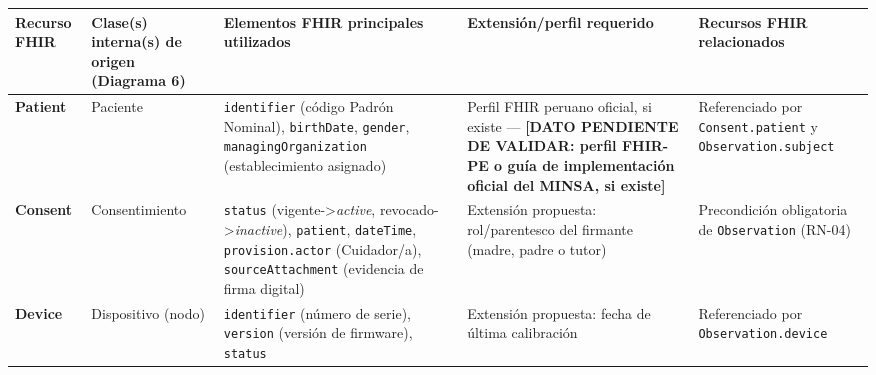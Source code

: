 \documentclass[11pt,a4paper]{article}
\begin{document}
{\small
\begin{longtable}[]{@{}
  >{\raggedright\arraybackslash}p{}
  >{\raggedright\arraybackslash}p{}
  >{\raggedright\arraybackslash}p{}
  >{\raggedright\arraybackslash}p{}
  >{\raggedright\arraybackslash}p{}@{}}
\toprule\noalign{}
\begin{minipage}[b]{\linewidth}\raggedright
Recurso FHIR
\end{minipage} & \begin{minipage}[b]{\linewidth}\raggedright
Clase(s) interna(s) de origen (Diagrama 6)
\end{minipage} & \begin{minipage}[b]{\linewidth}\raggedright
Elementos FHIR principales utilizados
\end{minipage} & \begin{minipage}[b]{\linewidth}\raggedright
Extensión/perfil requerido
\end{minipage} & \begin{minipage}[b]{\linewidth}\raggedright
Recursos FHIR relacionados
\end{minipage} \\
\midrule\noalign{}
\endhead
\bottomrule\noalign{}
\endlastfoot
\textbf{Patient} & Paciente & \texttt{identifier} (código Padrón Nominal), \texttt{birthDate}, \texttt{gender}, \texttt{managingOrganization} (establecimiento asignado) & Perfil FHIR peruano oficial, si existe --- \textbf{{[}DATO PENDIENTE DE VALIDAR: perfil FHIR-PE o guía de implementación oficial del MINSA, si existe{]}} & Referenciado por \texttt{Consent.patient} y \texttt{Observation.subject} \\
\textbf{Consent} & Consentimiento & \texttt{status} (vigente-\textgreater{}\emph{active}, revocado-\textgreater{}\emph{inactive}), \texttt{patient}, \texttt{dateTime}, \texttt{provision.actor} (Cuidador/a), \texttt{sourceAttachment} (evidencia de firma digital) & Extensión propuesta: rol/parentesco del firmante (madre, padre o tutor) & Precondición obligatoria de \texttt{Observation} (RN-04) \\
\textbf{Device} & Dispositivo (nodo) & \texttt{identifier} (número de serie), \texttt{version} (versión de firmware), \texttt{status} & Extensión propuesta: fecha de última calibración & Referenciado por \texttt{Observation.device} \\

\end{longtable}}
\end{document}
